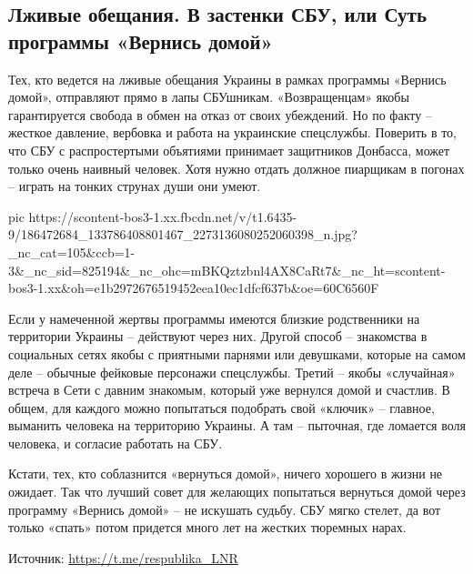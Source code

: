  
 
 
 
 
\subsection{Лживые обещания. В застенки СБУ, или Суть программы «Вернись домой»}
\label{sec:16_05_2021.fb.respublikalnr.1.vernis_domoj_sbu}

Тех, кто ведется на лживые обещания Украины в рамках программы «Вернись домой»,
отправляют прямо в лапы СБУшникам. «Возвращенцам» якобы гарантируется свобода в
обмен на отказ от своих убеждений. Но по факту – жесткое давление, вербовка и
работа на украинские спецслужбы. Поверить в то, что СБУ с распростертыми
объятиями принимает защитников Донбасса, может только очень наивный человек.
Хотя нужно отдать должное пиарщикам в погонах – играть на тонких струнах души
они умеют.


\ifcmt
  pic https://scontent-bos3-1.xx.fbcdn.net/v/t1.6435-9/186472684_133786408801467_2273136080252060398_n.jpg?_nc_cat=105&ccb=1-3&_nc_sid=825194&_nc_ohc=mBKQztzbnl4AX8CaRt7&_nc_ht=scontent-bos3-1.xx&oh=e1b2972676519452eea10ec1dfcf637b&oe=60C6560F
\fi


Если у намеченной жертвы программы имеются близкие родственники на территории
Украины – действуют через них. Другой способ – знакомства в социальных сетях
якобы с приятными парнями или девушками, которые на самом деле – обычные
фейковые персонажи спецслужбы. Третий – якобы «случайная» встреча в Сети с
давним знакомым, который уже вернулся домой и счастлив. В общем, для каждого
можно попытаться подобрать свой «ключик» – главное, выманить человека на
территорию Украины. А там – пыточная, где ломается воля человека, и согласие
работать на СБУ.

Кстати, тех, кто соблазнится «вернуться домой», ничего хорошего в жизни не
ожидает. Так что лучший совет для желающих попытаться вернуться домой через
программу «Вернись домой» – не искушать судьбу. СБУ мягко стелет, да вот только
«спать» потом придется много лет на жестких тюремных нарах.

Источник:  \url{https://t.me/respublika_LNR}
